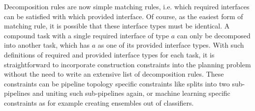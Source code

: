 Decomposition rules are now simple matching rules, i.e. which required interfaces can be satisfied with which provided interface.
Of course, as the easiest form of matching rule, it is possible that these interface types must be identical.
A compound task with a single required interface of type $a$ can only be decomposed into another task, which has $a$ as one of its provided interface types.
With such definitions of required and provided interface types for each task, it is straightforward to incorporate construction constraints into the planning problem without the need to write an extensive list of decomposition rules.
These constraints can be pipeline topology specific constraints like splits into two sub-pipelines and uniting such sub-pipelines again, or machine learning specific constraints as for example creating ensembles out of classifiers.


